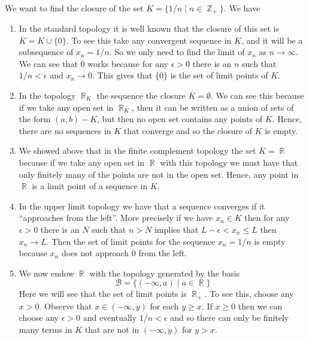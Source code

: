 \documentclass{article}
\DeclareMathOperator{\Z}{\mathbb{Z}}
\DeclareMathOperator{\R}{\mathbb{R}}
\DeclareMathOperator{\suchthat}{\mathrel{|}}
\newcommand{\problem}[1]{\noindent{\textbf{Problem #1}}\\}
\newcommand{\problempart}[1]{\noindent{\textbf{(#1)}}}
\begin{document}
\problem{17.16} 
\problempart{a} We want to find the closure of the set $K = \{1/n \suchthat n \in \Z_+\}$. We have
\begin{enumerate}
\item In the standard topology it is well known that the closure of this set is $\overline{K} = K \cup \{0\}$. To see this take any convergent sequence in $K$, and it will be a subsequence of $x_n = 1/n$. So we only need to find the limit of $x_n$ as $n\to \infty$. We can see that $0$ works because for any $\epsilon > 0$ there is an $n$ such that $1/n < \epsilon$ and $x_n \to 0$. This gives that $\{0\}$ is the set of limit points of $K$. 
\item In the topology $\R_K$ the sequence the closure $\overline{K} = \emptyset$. We can see this because if we take any open set in $\R_K$, then it can be written as a union of sets of the form $(a,b) - K$, but then no open set contains any points of $K$. Hence, there are no sequences in $K$ that converge and so the closure of $K$ is empty. 
\item We showed above that in the finite complement topology the set $\overline{K} = \R$ because if we take any open set in $\R$ with this topology we must have that only finitely many of the points are not in the open set. Hence, any point in $\R$ is a limit point of a sequence in $K$. 
\item In the upper limit topology we have that a sequence converges if it ``approaches from the left''. More precisely if we have $x_n \in K$ then for any $\epsilon > 0$ there is an $N$ such that $n > N$ implies that
$L-\epsilon < x_n \leq L$ then $x_n \to L$. Then the set of limit points for the sequence $x_n = 1/n$ is empty because $x_n$ does not approach 0 from the left. 
\item We now endow $\R$ with the topology generated by the basis 
\[
\mathcal{B} = \{(-\infty, a) \suchthat a \in \R\} 
\]
Here we will see that the set of limit points is $\R_+$. To see this, choose any $x > 0$. Observe that $x \in (-\infty, y)$ for each $y \geq x$. If $x \geq 0$ then we can choose any $\epsilon > 0$ and eventually $1/n < \epsilon$ and so there can only be finitely many terms in $K$ that are not in $(-\infty, y)$ for $y > x$.  
\end{enumerate}
\end{document}
